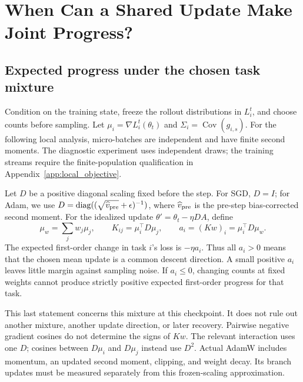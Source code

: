 \section{When Can a Shared Update Make Joint Progress?}
\label{sec:theory}

\subsection{Expected progress under the chosen task mixture}

Condition on the training state, freeze the rollout distributions in
$L_i^t$, and choose counts before sampling. Let
$\mu_i=\nabla L_i^t(\theta_t)$ and
$\Sigma_i=\operatorname{Cov}(g_{i,s})$. For the following local analysis,
micro-batches are independent and have finite second moments. The
diagnostic experiment uses independent draws; the training streams require
the finite-population qualification in Appendix~\ref{app:local_objective}.

Let $D$ be a positive diagonal scaling fixed before the step. For SGD,
$D=I$; for Adam, we use
$D=\operatorname{diag}((\sqrt{\widehat v_{\rm pre}}+\epsilon)^{-1})$,
where $\widehat v_{\rm pre}$ is the pre-step bias-corrected second moment.
For the idealized update $\theta'=\theta_t-\eta DA$, define
\begin{equation}
    \mu_w=\sum_jw_j\mu_j,\qquad
    K_{ij}=\mu_i^\top D\mu_j,\qquad
    a_i=(Kw)_i=\mu_i^\top D\mu_w.
    \label{eq:transfer_margins}
\end{equation}
The expected first-order change in task $i$'s loss is $-\eta a_i$.
Thus all $a_i>0$ means that the chosen mean update is a common descent
direction. A small positive $a_i$ leaves little margin against sampling
noise. If $a_i\leq0$, changing counts at fixed weights cannot produce
strictly positive expected first-order progress for that task.

This last statement concerns this mixture at this checkpoint. It does
not rule out another mixture, another update direction, or later recovery.
Pairwise negative gradient cosines do not determine the signs of $Kw$.
The relevant interaction uses one $D$; cosines between $D\mu_i$ and
$D\mu_j$ instead use $D^2$. Actual AdamW includes momentum, an updated
second moment, clipping, and weight decay. Its branch updates must be
measured separately from this frozen-scaling approximation.

